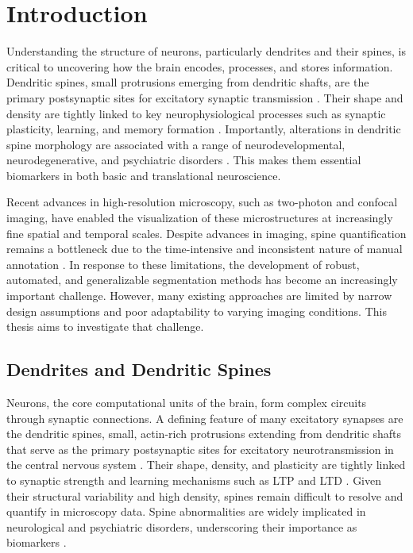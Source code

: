 \chapter{Introduction}

Understanding the structure of neurons, particularly dendrites and their spines, is critical to uncovering how the brain encodes, processes, and stores information. Dendritic spines, small protrusions emerging from dendritic shafts, are the primary postsynaptic sites for excitatory synaptic transmission \cite{Yuste_1995}. Their shape and density are tightly linked to key neurophysiological processes such as synaptic plasticity, learning, and memory formation \cite{Yuste_2001, Pfeiffer_2018}. Importantly, alterations in dendritic spine morphology are associated with a range of neurodevelopmental, neurodegenerative, and psychiatric disorders \cite{Rodriguez_2008, Dickstein_2016}. This makes them essential biomarkers in both basic and translational neuroscience.

Recent advances in high-resolution microscopy, such as two-photon and confocal imaging, have enabled the visualization of these microstructures at increasingly fine spatial and temporal scales. Despite advances in imaging, spine quantification remains a bottleneck due to the time-intensive and inconsistent nature of manual annotation \cite{Fernholz_2024}. In response to these limitations, the development of robust, automated, and generalizable segmentation methods has become an increasingly important challenge. However, many existing approaches are limited by narrow design assumptions and poor adaptability to varying imaging conditions. This thesis aims to investigate that challenge. 

\section{Dendrites and Dendritic Spines}

Neurons, the core computational units of the brain, form complex circuits through synaptic connections. A defining feature of many excitatory synapses are the dendritic spines, small, actin-rich protrusions extending from dendritic shafts that serve as the primary postsynaptic sites for excitatory neurotransmission in the central nervous system \cite{Yuste_1995}. Their shape, density, and plasticity are tightly linked to synaptic strength and learning mechanisms such as \gls{LTP} and \gls{LTD} \cite{Yuste_2001, Pfeiffer_2018}. Given their structural variability and high density, spines remain difficult to resolve and quantify in microscopy data. Spine abnormalities are widely implicated in neurological and psychiatric disorders, underscoring their importance as biomarkers \cite{Rodriguez_2008, Dickstein_2016}.

